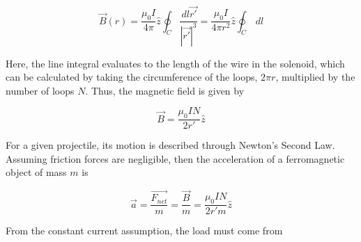 \begin{equation}
	\vec{B}(r)=\frac{\mu_0 I}{4\pi}\hat{z}\oint_C \frac{ \,dl \vec{r'}}{|\vec{r'}|^3}=\frac{\mu_0 I}{4\pi r^2}\hat{z}\oint_C {\,dl}
\end{equation}

\noindent Here, the line integral evaluates to the length of the wire in the solenoid, which can be calculated by taking the circumference of the loops, $2\pi r$, multiplied by the number of loops $N$. Thus, the magnetic field is given by 

\begin{equation}
	\vec{B}=\frac{\mu_0 IN}{2r'}\hat{z}
\end{equation}

\noindent For a given projectile, its motion is described through Newton's Second Law. Assuming friction forces are negligible, then the acceleration of a ferromagnetic object of mass $m$ is 

\begin{equation}
	\vec{a} = \frac{\vec{F_{net}}}{m}=\frac{\vec{B}}{m}=\frac{\mu_0 IN}{2r'm}\hat{z}
\end{equation}

\noindent From the constant current assumption, the load must come from 